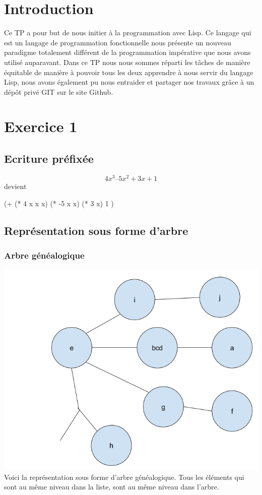 \documentclass[a4paper,10pt]{report}
\begin{document}
\chapter*{Introduction}

Ce TP a pour but de nous initier à la programmation avec Lisp. Ce langage qui est un langage de programmation fonctionnelle nous présente un nouveau paradigme totalement 
différent de la programmation impérative que nous avons utilisé auparavant.\newline
Dans ce TP nous nous sommes réparti les tâches de manière équitable de manière à pouvoir tous les deux apprendre à nous servir du langage Lisp, nous avons également
pu nous entraider et partager nos travaux grâce à un dépôt privé GIT sur le site Github.


\chapter{Exercice 1}

  \section{Ecriture préfixée}
  
  $$4x^3 – 5x^2 + 3x + 1 $$ devient \begin{center}(+ (* 4 x x x) (* -5 x x) (* 3 x) 1 )\end{center}
  
  \section{Représentation sous forme d'arbre}
  \subsection*{Arbre généalogique}
  \includegraphics[scale = 0.4]{schema}\newline
  Voici la représentation sous forme d'arbre généalogique. Tous les éléments qui sont au même niveau dans la liste, sont au même niveau dans l'arbre.
\end{document}
